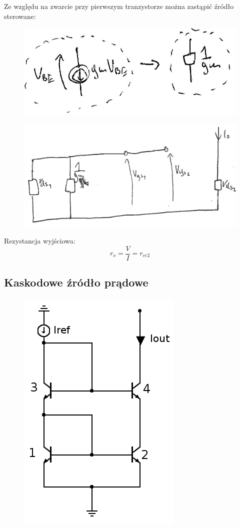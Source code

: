 \documentclass[10pt,a4paper]{article}
\begin{document}
Ze względu na zwarcie przy pierwszym tranzystorze można zastąpić źródło sterowane:
\begin{figure}[H]
\centering
\includegraphics[scale=0.8]{lustr_wyp2}
\end{figure}
\begin{figure}[H]
\centering
\includegraphics[scale=0.8]{lustr_wyp3}
\end{figure}

Rezystancja wyjściowa: 
\begin{equation}
r_o = \dfrac{V}{I} = r_{ce2}
\end{equation}

\subsection{Kaskodowe źródło prądowe}
\begin{figure}[H]
\centering
\includegraphics[scale=0.5]{kaskoda}
\end{figure}
\end{document}

